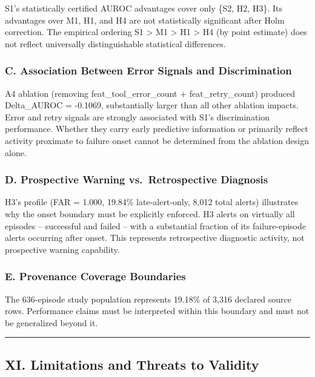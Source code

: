 \documentclass[
]{article}
\begin{document}
S1's statistically certified AUROC advantages cover only \{S2, H2, H3\}.
Its advantages over M1, H1, and H4 are not statistically significant
after Holm correction. The empirical ordering S1 \textgreater{} M1
\textgreater{} H1 \textgreater{} H4 (by point estimate) does not reflect
universally distinguishable statistical differences.

\subsubsection{C. Association Between Error Signals and
Discrimination}\label{c.-association-between-error-signals-and-discrimination}

A4 ablation (removing feat\_tool\_error\_count + feat\_retry\_count)
produced Delta\_AUROC = -0.1069, substantially larger than all other
ablation impacts. Error and retry signals are strongly associated with
S1's discrimination performance. Whether they carry early predictive
information or primarily reflect activity proximate to failure onset
cannot be determined from the ablation design alone.

\subsubsection{D. Prospective Warning vs.~Retrospective
Diagnosis}\label{d.-prospective-warning-vs.-retrospective-diagnosis}

H3's profile (FAR = 1.000, 19.84\% late-alert-only, 8,012 total alerts)
illustrates why the onset boundary must be explicitly enforced. H3
alerts on virtually all episodes -- successful and failed -- with a
substantial fraction of its failure-episode alerts occurring after
onset. This represents retrospective diagnostic activity, not
prospective warning capability.

\subsubsection{E. Provenance Coverage
Boundaries}\label{e.-provenance-coverage-boundaries}

The 636-episode study population represents 19.18\% of 3,316 declared
source rows. Performance claims must be interpreted within this boundary
and must not be generalized beyond it.

\begin{center}\rule{0.5\linewidth}{0.5pt}\end{center}

\subsection{XI. Limitations and Threats to
Validity}\label{xi.-limitations-and-threats-to-validity}
\end{document}
